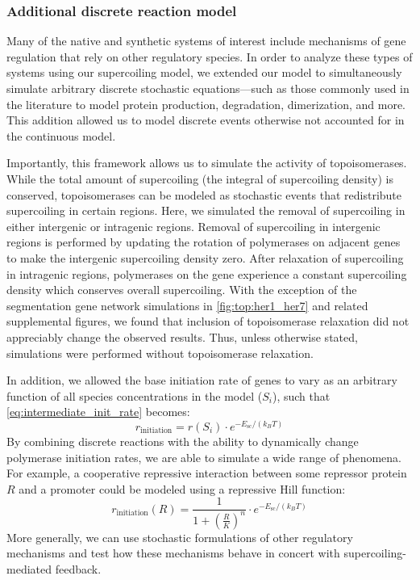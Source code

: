 \documentclass[11pt]{article} %
\begin{document}
\subsubsection{Additional discrete reaction model}
Many of the native and synthetic systems of interest include mechanisms of gene regulation that rely on other regulatory species. In order to analyze these types of systems using our supercoiling model, we extended our model to simultaneously simulate arbitrary discrete stochastic equations---such as those commonly used in the literature to model protein production, degradation, dimerization, and more. This addition allowed us to model discrete events otherwise not accounted for in the continuous model.

Importantly, this framework allows us to simulate the activity of topoisomerases. While the total amount of supercoiling (the integral of supercoiling density) is conserved, topoisomerases can be modeled as stochastic events that redistribute supercoiling in certain regions. Here, we simulated the removal of supercoiling in either intergenic or intragenic regions. Removal of supercoiling in intergenic regions is performed by updating the rotation of polymerases on adjacent genes to make the intergenic supercoiling density zero. After relaxation of supercoiling in intragenic regions, polymerases on the gene experience a constant supercoiling density which conserves overall supercoiling. With the exception of the segmentation gene network simulations in \cref{fig:top:her1_her7} and related supplemental figures, we found that inclusion of topoisomerase relaxation did not appreciably change the observed results. Thus, unless otherwise stated, simulations were performed without topoisomerase relaxation.

In addition, we allowed the base initiation rate of genes to vary as an arbitrary function of all species concentrations in the model (\(S_i\)), such that \cref{eq:intermediate_init_rate} becomes:
\begin{equation}
    r_\text{initiation} = r(S_i) \cdot e^{- E_\text{sc} / (k_B T)}
\label{eq:final_init_rate}
\end{equation}
By combining discrete reactions with the ability to dynamically change polymerase initiation rates, we are able to simulate a wide range of phenomena.
For example, a cooperative repressive interaction between some repressor protein \(R\) and a promoter could be modeled using a repressive Hill function:
\begin{equation*}
    r_\text{initiation}(R) = \frac{1}{1 + \left(\frac{R}{K}\right)^n} \cdot e^{-E_\text{sc} / (k_B T)}
\end{equation*}
More generally, we can use stochastic formulations of other regulatory mechanisms and test how these mechanisms behave in concert with supercoiling-mediated feedback.
\end{document}
